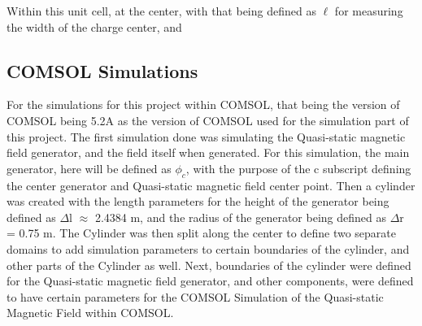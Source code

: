 \documentclass[]{article}
\begin{document}
\begin{figure}[H]
\end{figure}
\noindent
Within this unit cell, at the center, with that being defined as $\ell$ for measuring the width of the charge center, and 
\subsection*{COMSOL Simulations}
For the simulations for this project within COMSOL, that being the version of COMSOL being 5.2A as the version of COMSOL used for the simulation part of this project. The first simulation done was simulating the Quasi-static magnetic field generator, and the field itself when generated. For this simulation, the main generator, here will be defined as $\phi_c$, with the purpose of the c subscript defining the center generator and Quasi-static magnetic field center point. Then a cylinder was created with the length parameters for the height of the generator being defined as $\Delta$l $\approx$ 2.4384 m, and the radius of the generator being defined as $\Delta$r = 0.75 m. The Cylinder was then split along the center to define two separate domains to add simulation parameters to certain boundaries of the cylinder, and other parts of the Cylinder as well. Next, boundaries of the cylinder were defined for the Quasi-static magnetic field generator, and other components, were defined to have certain parameters for the COMSOL Simulation of the Quasi-static Magnetic Field within COMSOL.
\end{document}
